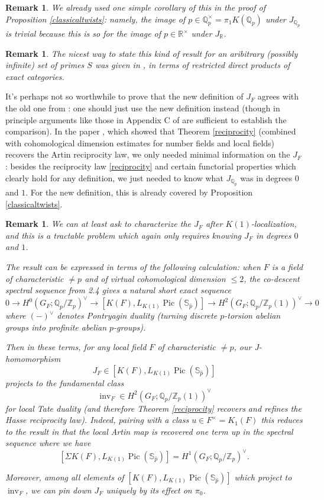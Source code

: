 \documentclass[12pt]{article}
\newtheorem{remark}[theorem]{Remark}
\newcommand{\on}{\operatorname}
\newcommand{\mbb}{\mathbb}
\newcommand{\wh}{\widehat}
\begin{document}
\begin{remark}
We already used one simple corollary of this in the proof of Proposition \ref{classicaltwists}: namely, the image of $p\in \mbb{Q}_p^\times = \pi_1 K(\mbb{Q}_p)$ under $J_{\mbb{Q}_p}$ is trivial because this is so for the image of $p\in\mbb{R}^\times$ under $J_{\mbb{R}}$.
\end{remark}

\begin{remark}
The nicest way to state this kind of result for an aribitrary (possibly infinite) set of primes $S$ was given in \cite{BraunlingLocalCompact}, in terms of restricted direct products of exact categories.
\end{remark}

It's perhaps not so worthwhile to prove that the new definition of $J_F$ agrees with the old one from \cite{ClausenJ}: one should just use the new definition instead (though in principle arguments like those in Appendix C of \cite{ClausenJ} are sufficient to establish the comparison).  In the paper \cite{ClausenArtin}, which showed that Theorem \ref{reciprocity} (combined with cohomological dimension estimates for number fields and local fields) recovers the Artin reciprocity law, we only needed minimal information on the $J_F$: besides the reciprocity law \ref{reciprocity} and certain functorial properties which clearly hold for any definition, we just needed to know what $J_{\mbb{Q}_p}$ was in degrees $0$ and $1$.  For the new definition, this is already covered by Proposition \ref{classicaltwists}.

\begin{remark}
We can at least ask to characterize the $J_F$ after $K(1)$-localization, and this is a tractable problem which again only requires knowing $J_F$ in degrees $0$ and $1$.

 The result can be expressed in terms of the following calculation: when $F$ is a field of characteristic $\neq p$ and of virtual cohomological dimension $\leq 2$, the co-descent spectral sequence from \cite{ClausenArtin} 2.4 gives a natural short exact sequence
$$0 \to H^0(G_F;\mbb{Q}_p/\mbb{Z}_p)^\vee \to [K(F),L_{K(1)}\on{Pic}(\mbb{S}_{\wh{p}})] \to H^2(G_F;\mbb{Q}_p/\mbb{Z}_p(1))^\vee\to 0$$
where $(-)^\vee$ denotes Pontryagin duality (turning discrete $p$-torsion abelian groups into profinite abelian $p$-groups).

Then in these terms, for any local field $F$ of characteristic $\neq p$, our J-homomorphism
$$J_F \in [K(F),L_{K(1)}\on{Pic}(\mbb{S}_{\wh{p}})]$$
projects to the fundamental class
$$\on{inv}_F\in H^2(G_F;\mbb{Q}_p/\mbb{Z}_p(1))^\vee$$
for local Tate duality (and therefore Theorem \ref{reciprocity} recovers and refines the Hasse reciprocity law).  Indeed, pairing with a class $u\in F^\times =K_1(F)$ this reduces to the result in \cite{ClausenArtin} that the local Artin map is recovered one term up in the spectral sequence where we have
$$[\Sigma K(F), L_{K(1)}\on{Pic}(\mbb{S}_{\wh{p}})] = H^1(G_F;\mbb{Q}_p/\mbb{Z}_p)^\vee.$$

Moreover, among all elements of $[K(F),L_{K(1)}\on{Pic}(\mbb{S}_{\wh{p}})]$ which project to $\on{inv}_F$, we can pin down $J_F$ uniquely by its effect on $\pi_0$.
\end{remark}
\end{document}
